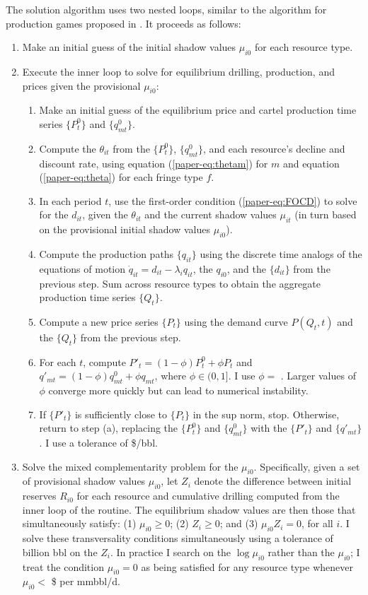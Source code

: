 \documentclass[12pt]{article}
\begin{document}
The solution algorithm uses two nested loops, similar to the algorithm for production games proposed in \cite{salant1982}. It proceeds as follows:
\begin{enumerate}
\item Make an initial guess of the initial shadow values $\mu_{i0}$ for each resource type.
\item Execute the inner loop to solve for equilibrium drilling, production, and prices given the provisional $\mu_{i0}$:
\begin{enumerate}
\item Make an initial guess of the equilibrium price and cartel production time series $\{P_t^0\}$ and $\{q_{mt}^0\}$.
\item Compute the $\theta_{it}$ from the $\{P_t^0\}$, $\{q_{mt}^0\}$, and each resource's decline and discount rate, using equation (\ref{paper-eq:thetam}) for $m$ and equation (\ref{paper-eq:theta}) for each fringe type $f$.
\item In each period $t$, use the first-order condition (\ref{paper-eq:FOCD}) to solve for the $d_{it}$, given the $\theta_{it}$ and the current shadow values $\mu_{it}$ (in turn based on the provisional initial shadow values $\mu_{i0}$).
\item Compute the production paths $\{q_{it}\}$ using the discrete time analogs of the equations of motion $\dot{q}_{it}=d_{it}-\lambda_iq_{it}$, the $q_{i0}$, and the $\{d_{it}\}$ from the previous step. Sum across resource types to obtain the aggregate production time series $\{Q_{t}\}$.
\item Compute a new price series $\{P_t\}$ using the demand curve $P(Q_t,t)$ and the $\{Q_{t}\}$ from the previous step.
\item For each $t$, compute $P'_t=(1-\phi)P_t^0+\phi P_t$ and $q'_{mt}=(1-\phi)q_{mt}^0+\phi q_{mt}$, where $\phi\in(0,1]$. I use $\phi=$ \unskip. Larger values of $\phi$ converge more quickly but can lead to numerical instability.
\item If $\{P'_t\}$ is sufficiently close to $\{P_t\}$ in the sup norm, stop. Otherwise, return to step (a), replacing the $\{P_t^0\}$ and $\{q_{mt}^0\}$ with the $\{P'_t\}$ and $\{q'_{mt}\}$. I use a tolerance of \$/bbl.
\end{enumerate}
\item Solve the mixed complementarity problem for the $\mu_{i0}$. Specifically, given a set of provisional shadow values $\mu_{i0}$, let $Z_i$ denote the difference between initial reserves $R_{i0}$ for each resource and cumulative drilling computed from the inner loop of the routine. The equilibrium shadow values are then those that simultaneously satisfy: (1) $\mu_{i0}\geq0$; (2) $Z_i\geq0$; and (3) $\mu_{i0}Z_i=0$, for all $i$. I solve these transversality conditions simultaneously using a tolerance of billion bbl on the $Z_i$. In practice I search on the $\log\mu_{i0}$ rather than the $\mu_{i0}$; I treat the condition $\mu_{i0}=0$ as being satisfied for any resource type whenever $\mu_{i0}<$ \$ per mmbbl/d.
\end{enumerate}
\end{document}
